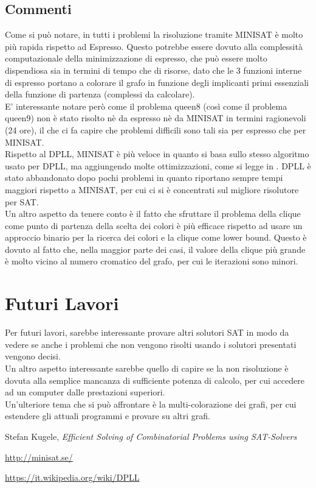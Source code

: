 \documentclass[a4paper,11pt]{article} %
\begin{document}


\subsection{Commenti}
Come si può notare, in tutti i problemi la risoluzione tramite MINISAT è molto più rapida rispetto ad Espresso. Questo potrebbe essere dovuto alla complessità computazionale della minimizzazione di espresso, che può essere molto dispendiosa sia in termini di tempo che di risorse, dato che le 3 funzioni interne di espresso portano a colorare il grafo in funzione degli implicanti primi essenziali della funzione di partenza (complessi da calcolare).\\
E' interessante notare però come il problema queen8 (così come il problema queen9) non è stato risolto nè da espresso nè da MINISAT in termini ragionevoli (24 ore), il che ci fa capire che problemi difficili sono tali sia per espresso che per MINISAT.\\
Rispetto al DPLL, MINISAT è più veloce in quanto si basa sullo stesso algoritmo usato per DPLL, ma aggiungendo molte ottimizzazioni, come si legge in \cite{minisat}. DPLL è stato abbandonato dopo pochi problemi in quanto riportano sempre tempi maggiori rispetto a MINISAT, per cui ci si è concentrati sul migliore risolutore per SAT.\\
Un altro aspetto da tenere conto è il fatto che sfruttare il problema della clique come punto di partenza della scelta dei colori è più efficace rispetto ad usare un approccio binario per la ricerca dei colori e la clique come lower bound. Questo è dovuto al fatto che, nella maggior parte dei casi, il valore della clique più grande è molto vicino al numero cromatico del grafo, per cui le iterazioni sono minori.

\pagebreak

\section{Futuri Lavori}
Per futuri lavori, sarebbe interessante provare altri solutori SAT in modo da vedere se anche i problemi che non vengono risolti usando i solutori presentati vengono decisi.\\
Un altro aspetto interessante sarebbe quello di capire se la non risoluzione è dovuta alla semplice mancanza di sufficiente potenza di calcolo, per cui accedere ad un computer dalle prestazioni superiori.\\
Un'ulteriore tema che si può affrontare è la multi-colorazione dei grafi, per cui estendere gli attuali programmi e provare su altri grafi.


\pagebreak

\begin{thebibliography}{9}
	 Stefan Kugele,  
	\emph{Efficient Solving of Combinatorial Problems using SAT-Solvers}
	
	 \href{http://minisat.se/}{http://minisat.se/}
	
	 \href{https://it.wikipedia.org/wiki/DPLL}{https://it.wikipedia.org/wiki/DPLL}
\end{thebibliography}
\end{document}

